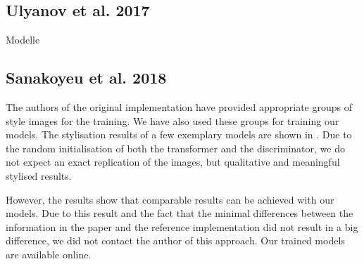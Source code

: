 \subsection{Ulyanov et al. 2017}
Modelle

\subsection{Sanakoyeu et al. 2018}

The authors of the original implementation have provided appropriate groups of style images for the training. We have also used these groups for training our models. The stylisation results of a few exemplary models are shown in \figref{}. Due to the random initialisation of both the transformer and the discriminator, we do not expect an exact replication of the images, but qualitative and meaningful stylised results. 

However, the results show that comparable results can be achieved with our models. Due to this result and the fact that the minimal differences between the information in the paper and the reference implementation did not result in a big difference, we did not contact the author of this approach. Our trained models are available online.

